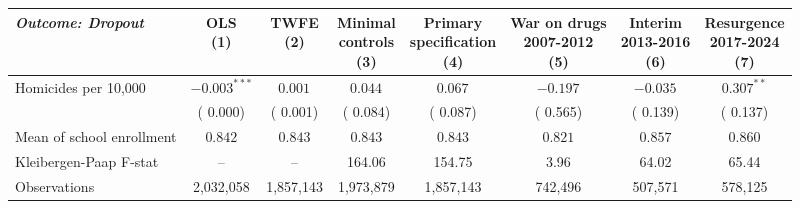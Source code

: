 \begin{tabular}{l c c c c c c c }
\hline\hline
 {\small \textit{Outcome: Dropout}} & \shortstack{OLS \\ (1)} & \shortstack{TWFE  \\ (2)} & \shortstack{Minimal \\ controls \\ (3)} & \shortstack{Primary \\ specification \\ (4)} & \shortstack{War on drugs \\ 2007-2012 \\ (5)} & \shortstack{Interim \\ 2013-2016 \\ (6)} & \shortstack{Resurgence \\ 2017-2024 \\  (7)} \\
\hline
Homicides per 10,000
 & $-0.003^{***}$ & $ 0.001^{}$ & $ 0.044^{}$ & $ 0.067^{}$ & $-0.197^{}$ & $-0.035^{}$ & $ 0.307^{**}$  \\
 & ( 0.000) & ( 0.001) & ( 0.084) & ( 0.087) & ( 0.565) & ( 0.139) & ( 0.137)  \\
\hline
Mean of school enrollment
 & $ 0.842$ & $ 0.843$ & $ 0.843$ & $ 0.843$ & $ 0.821$ & $ 0.857$ & $ 0.860$ \\
Kleibergen-Paap F-stat
 & -- & -- & 164.06 & 154.75 &   3.96 &  64.02 &  65.44 \\
\hline
Observations
 & 2,032,058 & 1,857,143 & 1,973,879 & 1,857,143 &   742,496 &   507,571 &   578,125 \\
\hline\hline
\end{tabular}
